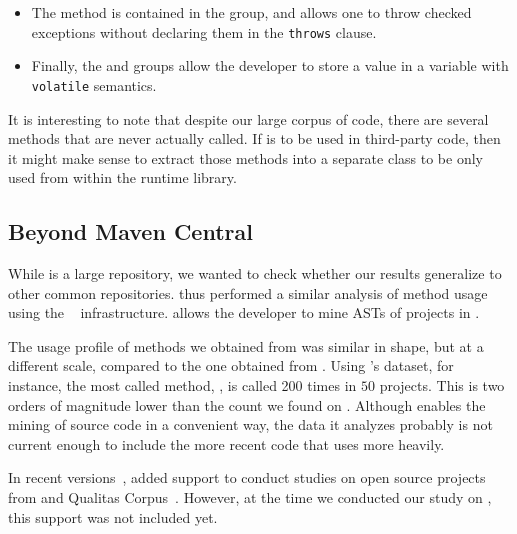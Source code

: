 \begin{itemize}
\item The  method is contained in the  group, and allows one to throw checked exceptions without declaring them in the \texttt{throws} clause.

\item Finally, the  and  groups allow the developer to store a value in a \java{} variable with \texttt{volatile} semantics.

\end{itemize}

It is interesting to note that despite our large corpus of code,
there are several \unsafe{} methods that are never actually called.
If \unsafe{} is to be used in third-party code,
then it might make sense to extract those methods into a separate class to be only used from within the runtime library.

\subsection*{Beyond Maven Central}

While \mavencentral{} is a large repository,
we wanted to check whether our results generalize to other common repositories.
thus performed a similar analysis of method usage using the \boa{}~\cite{dyerBoaLanguageInfrastructure2013,dyerMiningSourceCode2013} infrastructure.
\boa{} allows the developer to mine ASTs of \java{} projects in \sourceforge{}.

The usage profile of \unsafe{} methods we obtained from \boa{} was similar in shape,
but at a different scale, compared to the one obtained from \mavencentral{}.
Using \boa{}'s \sourceforge{} dataset, for instance,
the most called method, , 
is called 200 times in $50$ projects.
This is two orders of magnitude lower than the count we found on \mavencentral{}.
Although \boa{} enables the mining of source code in a convenient way, 
the \code{} data it analyzes probably is not current enough to include the more recent \java{} code that uses \smu{} more heavily.

In recent versions~\citep{boa-github},
\boa{} added support to conduct studies on open source projects from \github{} and Qualitas Corpus~\citep{temperoQualitasCorpusCurated2010}.
However, at the time we conducted our study on \unsafe{},
this support was not included yet.
